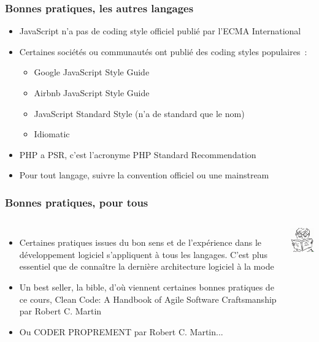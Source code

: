 \documentclass{beamer}
\begin{document}
    \begin{frame}
        \transdissolve
        \frametitle{Bonnes pratiques, les autres langages}

        \begin{itemize}

            \item JavaScript n'a pas de coding style officiel publié par l'ECMA International
            \item Certaines sociétés ou communautés ont publié des coding styles populaires~:

            \begin{itemize}
                \item Google JavaScript Style Guide
                \item Airbnb JavaScript Style Guide
                \item JavaScript Standard Style (n'a de standard que le nom)
                \item Idiomatic
            \end{itemize}
            \item PHP a PSR, c'est l'acronyme PHP Standard Recommendation
            \item Pour tout langage, suivre la convention officiel ou une mainstream

        \end{itemize}

    \end{frame}

    \begin{frame}
        \transdissolve
        \frametitle{Bonnes pratiques, pour tous}
        \begin{columns}
            \begin{itemize}

                \item Certaines pratiques issues du bon sens et de l'expérience dans le développement logiciel s'appliquent à tous les langages.
                C'est plus essentiel que de connaître la dernière architecture logiciel à la mode
                \item Un best seller, la bible, d'où viennent certaines bonnes pratiques de ce cours, Clean Code: A Handbook of Agile Software Craftsmanship par Robert C. Martin
                \item Ou CODER PROPREMENT par Robert C. Martin...

            \end{itemize}
            \centering
            \includegraphics[width=3cm]{image/kid-reading.png}
        \end{columns}

    \end{frame}
\end{document}
